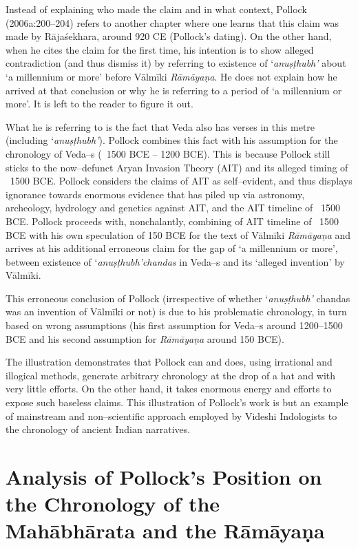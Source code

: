 Instead of explaining who made the claim and in what context, Pollock (2006a:200–204) refers to another chapter where one learns that this claim was made by Rājaśekhara, around 920 CE (Pollock’s dating). On the other hand, when he cites the claim for the first time, his intention is to show alleged contradiction (and thus dismiss it) by referring to existence of ‘\textit{anuṣṭhubh’} about ‘a millennium or more’ before Vālmīki \textit{Rāmāyaṇa}. He does not explain how he arrived at that conclusion or why he is referring to a period of ‘a millennium or more’. It is left to the reader to figure it out.

What he is referring to is the fact that Veda also has verses in this metre (including ‘\textit{anuṣṭhubh’}). Pollock combines this fact with his assumption for the chronology of Veda–s (~1500 BCE – 1200 BCE). This is because Pollock still sticks to the now–defunct Aryan Invasion Theory (AIT) and its alleged timing of ~1500 BCE. Pollock considers the claims of AIT as self–evident, and thus displays ignorance towards enormous evidence that has piled up via astronomy, archeology, hydrology and genetics against AIT, and the AIT timeline of ~1500 BCE. Pollock proceeds with, nonchalantly, combining of AIT timeline of ~1500 BCE with his own speculation of 150 BCE for the text of Vālmīki \textit{Rāmāyaṇa} and arrives at his additional erroneous claim for the gap of ‘a millennium or more’, between existence of ‘\textit{anuṣṭhubh’}\textit{chandas} in Veda–s and its ‘alleged invention’ by Vālmīki.

This erroneous conclusion of Pollock (irrespective of whether ‘\textit{anuṣṭhubh’} chandas was an invention of Vālmīki or not) is due to his problematic chronology, in turn based on wrong assumptions (his first assumption for Veda–s around 1200–1500 BCE and his second assumption for \textit{Rāmāyaṇa} around 150 BCE).

The illustration demonstrates that Pollock can and does, using irrational and illogical methods, generate arbitrary chronology at the drop of a hat and with very little efforts. On the other hand, it takes enormous energy and efforts to expose such baseless claims. This illustration of Pollock’s work is but an example of mainstream and non–scientific approach employed by Videshi Indologists to the chronology of ancient Indian narratives.


\section*{Analysis of Pollock’s Position on the Chronology of the Mahābhārata and the Rāmāyaṇa}

